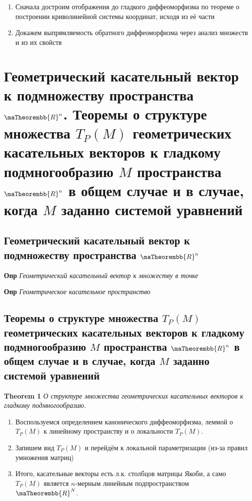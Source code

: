 \documentclass[a4paper, 14pt]{article}
\begin{document}
    \begin{enumerate}
        \item Сначала достроим отображения до гладкого диффеоморфизма по теореме о построении криволинейной системы
        координат, исходя из её части
        \item Докажем выпрямляемость обратного диффеоморфизма через анализ множеств и из их свойств
    \end{enumerate}
    
    \section{Геометрический касательный вектор к подмножеству пространства $\maTheorembb{R}^n$.
    Теоремы о структуре множества $T_P (M)$ геометрических касательных векторов к гладкому подмногообразию $M$
        пространства $\maTheorembb{R}^n$ в общем случае и в случае, когда $M$ заданно системой уравнений}
    
    \subsection{Геометрический касательный вектор к подмножеству пространства $\maTheorembb{R}^n$}
    
    \textbf{Опр} \textit{Геометрический касательный вектор к множеству в точке}
    
    \textbf{Опр} \textit{Геометрическое касательное пространство}
    
    \subsection{Теоремы о структуре множества $T_P (M)$ геометрических касательных векторов к гладкому
    подмногообразию $M$ пространства $\maTheorembb{R}^n$ в общем случае и в случае, когда $M$ заданно системой уравнений}
    
    \textbf{Theorem 1} \textit{О структуре множества геометрических касательных векторов к гладкому подмногообразию.}
    
    \begin{enumerate}
        \item Воспользуемся определением канонического диффеоморфизма, леммой о $T_P (M)$ к линейному пространству и
        о локальности $T_P (M)$.
        \item Запишем вид $T_P (M)$ и перейдём к локальной параметризации (из-за правил умножения матриц)
        \item Итого, касательные векторы есть л.к. столбцов матрицы Якоби, а само $T_P (M)$ является $n$-мерным
        линейным подпространством $\maTheorembb{R}^N$.
    \end{enumerate}
    
\end{document}
